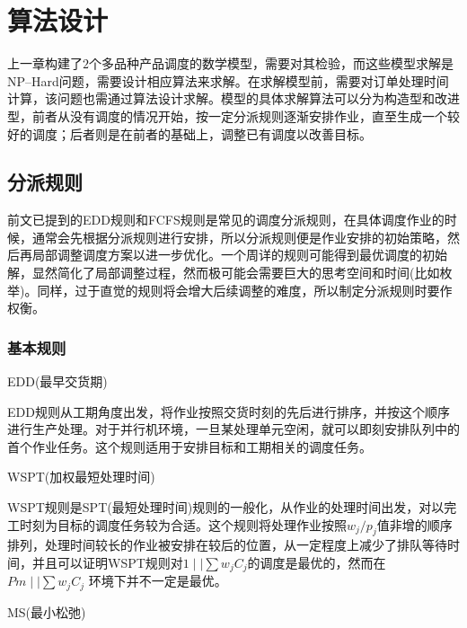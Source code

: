 \newcommand{\jobunit}[1]{*+[F]{\makebox[1.5em]{$#1$}}}
\newcommand{\process}[1]{*++=[o][F]{\makebox[2em]{$#1$}}}
\theoremheaderfont{\heiti}
\newtheorem{algori}[algor]{算法}%
\chapter{算法设计}
上一章构建了$2$个多品种产品调度的数学模型，需要对其检验，而这些模型求解是NP--Hard问题，需要设计相应算法来求解。在求解模型前，需要对订单处理时间计算，该问题也需通过算法设计求解。模型的具体求解算法可以分为构造型和改进型，前者从没有调度的情况开始，按一定分派规则逐渐安排作业，直至生成一个较好的调度；后者则是在前者的基础上，调整已有调度以改善目标。

\section{分派规则}
前文已提到的EDD规则和FCFS规则是常见的调度分派规则，在具体调度作业的时候，通常会先根据分派规则进行安排，所以分派规则便是作业安排的初始策略，然后再局部调整调度方案以进一步优化。一个周详的规则可能得到最优调度的初始解，显然简化了局部调整过程，然而极可能会需要巨大的思考空间和时间(比如枚举)。同样，过于直觉的规则将会增大后续调整的难度，所以制定分派规则时要作权衡。
\subsection{基本规则}
\begin{asparaenum}
\item EDD(最早交货期)

EDD规则从工期角度出发，将作业按照交货时刻的先后进行排序，并按这个顺序进行生产处理。对于并行机环境，一旦某处理单元空闲，就可以即刻安排队列中的首个作业任务。这个规则适用于安排目标和工期相关的调度任务。
\item WSPT(加权最短处理时间)

WSPT规则是SPT(最短处理时间)规则的一般化，从作业的处理时间出发，对以完工时刻为目标的调度任务较为合适。这个规则将处理作业按照$w_j/p_j$值非增的顺序排列，处理时间较长的作业被安排在较后的位置，从一定程度上减少了排队等待时间，并且可以证明WSPT规则对$1\mid \mid \sum w_jC_j$的调度是最优的\cite{pinedo}，然而在$Pm \mid \mid \sum w_jC_j$ 环境下并不一定是最优。

\item MS(最小松弛)
\end{asparaenum}

